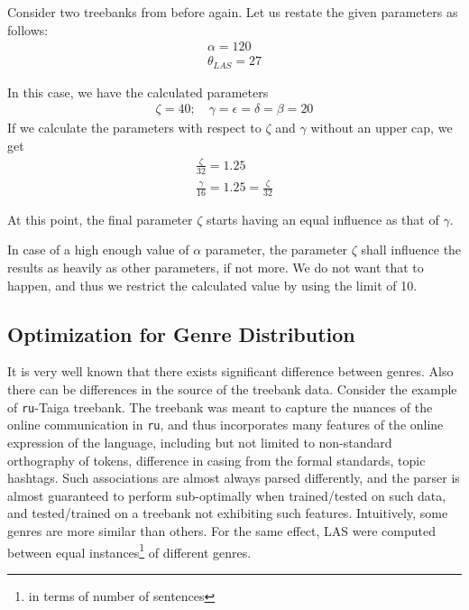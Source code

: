 \begin{example}
    Consider two treebanks from before again. Let us restate the given parameters as follows:
    \begin{gather*}
        \alpha = 120\\
        \theta_{LAS} = 27
    \end{gather*}
    
    In this case, we have the calculated parameters
    \begin{gather*}
        \zeta = 40; \quad \gamma = \epsilon = \delta = \beta = 20
    \end{gather*}
    If we calculate the parameters with respect to \(\zeta\) and \(\gamma\) without an upper cap, we get
    \begin{gather*}
        \frac{\zeta}{32} = 1.25\\
        \frac{\gamma}{16} = 1.25 = \frac{\zeta}{32}
    \end{gather*}
    
    At this point, the final parameter \(\zeta\) starts having an equal influence as that of \(\gamma\).
\end{example}

In case of a high enough value of \(\alpha\) parameter, the parameter \(\zeta\) shall influence the results as heavily as other parameters, if not more. We do not want that to happen, and thus we restrict the calculated value by using the limit of 10.

\newpage
\subsection{Optimization for Genre Distribution}
\label{ssec:genre_theta1}

It is very well known that there exists significant difference between genres. Also there can be differences in the source of the treebank data. Consider the example of \verb|ru|-Taiga treebank. The treebank was meant to capture the nuances of the online communication in \verb|ru|, and thus incorporates many features of the online expression of the language, including but not limited to non-standard orthography of tokens, difference in casing from the formal standards, topic hashtags. Such associations are almost always parsed differently, and the parser is almost guaranteed to perform sub-optimally when trained/tested on such data, and tested/trained on a treebank not exhibiting such features. Intuitively, some genres are more similar than others. For the same effect, LAS were computed between equal instances\footnote{in terms of number of sentences} of different genres. 


